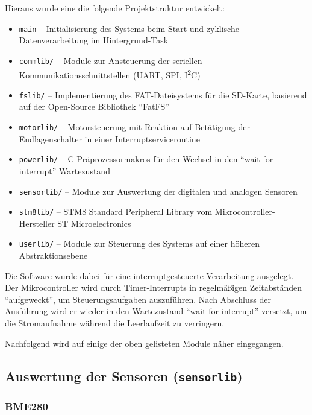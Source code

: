     Hieraus wurde eine die folgende Projektstruktur entwickelt:
    \begin{itemize}
        \item \texttt{main} -- Initialisierung des Systems beim Start und zyklische Datenverarbeitung im Hintergrund-Task
        \item \texttt{commlib/} -- Module zur Ansteuerung der seriellen Kommunikationsschnittstellen (UART, SPI, I\textsuperscript{2}C)
        \item \texttt{fslib/} -- Implementierung des FAT-Dateisystems für die SD-Karte, basierend auf der Open-Source Bibliothek ``FatFS''~\cite{elmchan_fatfs}
        \item \texttt{motorlib/} -- Motorsteuerung mit Reaktion auf Betätigung der Endlagenschalter in einer Interruptserviceroutine
        \item \texttt{powerlib/} -- C-Präprozessormakros für den Wechsel in den ``wait-for-interrupt'' Wartezustand
        \item \texttt{sensorlib/} -- Module zur Auswertung der digitalen und analogen Sensoren
        \item \texttt{stm8lib/} -- STM8 Standard Peripheral Library vom Mikrocontroller-Hersteller ST Microelectronics
        \item \texttt{userlib/} -- Module zur Steuerung des Systems auf einer höheren Abstraktionsebene
    \end{itemize}

    Die Software wurde dabei für eine interruptgesteuerte Verarbeitung ausgelegt. Der Mikrocontroller wird durch Timer-Interrupts in regelmäßigen Zeitabständen ``aufgeweckt'', um Steuerungsaufgaben auszuführen. Nach Abschluss der Ausführung wird er wieder in den Wartezustand ``wait-for-interrupt'' versetzt, um die Stromaufnahme während die Leerlaufzeit zu verringern.
    
    Nachfolgend wird auf einige der oben gelisteten Module näher eingegangen.
    
    \subsection{Auswertung der Sensoren (\texttt{sensorlib})}
    
        \subsubsection{BME280}\label{ssec:BME280}
    
